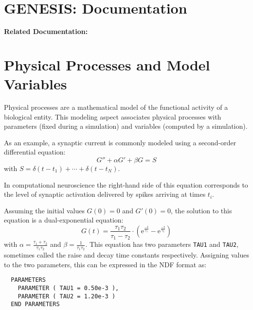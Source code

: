 \documentclass[12pt]{article}
\begin{document}
\section*{GENESIS: Documentation}

{\bf Related Documentation:}

\section*{Physical Processes and Model Variables}

Physical processes are a mathematical model of the functional activity
of a biological entity.  This modeling aspect associates physical
processes with parameters (fixed during a simulation) and variables
(computed by a simulation).

As an example, a synaptic current is commonly modeled using a
second-order differential equation:
\begin{equation}
  \label{eq:second-order-synchan}
  G'' + \alpha G' + \beta G = S
\end{equation}
with $S = \delta(t - t_1) + \cdots + \delta(t - t_N)$.

In computational neuroscience the right-hand side of this equation
corresponds to the level of synaptic activation delivered by spikes
arriving at times $t_i$.

Assuming the initial values $G(0) = 0$ and $G'(0) = 0$, the solution
to this equation is a dual-exponential equation:
\begin{equation}
  \label{eq:dual-exponential}
  G(t) = \frac{\tau_1\tau_2}{\tau_1 - \tau_2}
  \cdot (\mathrm{e}^{\frac{-t}{\tau_1}} - \mathrm{e}^{\frac{-t}{\tau_2}})
\end{equation}
with $\alpha = \frac{\tau_1 + \tau_2}{\tau_1 \tau_2}$ and $\beta =
\frac{1}{\tau_1 \tau_2}$.
This equation has two parameters {\tt TAU1} and {\tt TAU2}, sometimes
called the raise and decay time constants respectively.  Assigning
values to the two parameters, this can be expressed in the NDF format
as:

\begin{verbatim}
  PARAMETERS
    PARAMETER ( TAU1 = 0.50e-3 ),
    PARAMETER ( TAU2 = 1.20e-3 )
  END PARAMETERS
\end{verbatim}
\end{document}
